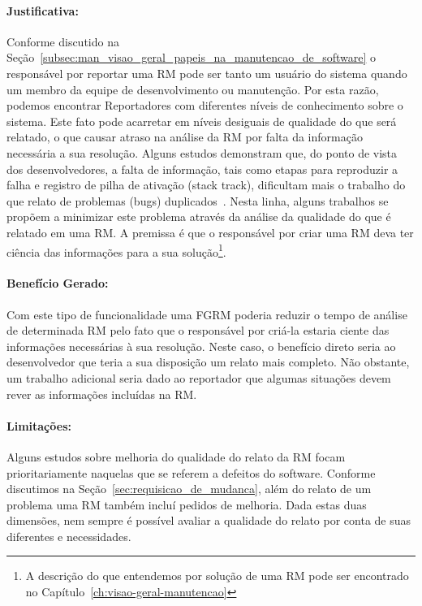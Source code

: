 
\paragraph{Justificativa:}
\label{par:justificativa_s01}

Conforme discutido na
Seção~\ref{subsec:man_visao_geral_papeis_na_manutencao_de_software} o
responsável por reportar uma RM pode ser tanto um usuário do sistema quando um
membro da equipe de desenvolvimento ou manutenção. Por esta razão, podemos
encontrar Reportadores com diferentes níveis de conhecimento sobre o sistema.
Este fato pode acarretar em níveis desiguais de qualidade do que será relatado,
o que causar atraso na análise da RM por falta da informação necessária a sua
resolução. Alguns estudos demonstram que, do ponto de vista dos desenvolvedores,
a falta de informação, tais como etapas para reproduzir a falha e registro de
pilha de ativação (stack track), dificultam mais o trabalho do que relato de
problemas (bugs) duplicados~\cite{bettenburg2008makes, bettenburg2007quality}.
Nesta linha, alguns trabalhos se propõem a minimizar este problema através da
análise da qualidade do que é relatado em uma RM\@. A premissa é que o
responsável por criar uma RM deva ter ciência das informações para a sua
solução\footnote{A descrição do que entendemos por solução de uma RM pode ser
    encontrado no Capítulo~\ref{ch:visao-geral-manutencao}}.

\paragraph{Benefício Gerado:}
\label{par:beneficio_s01}

Com este tipo de funcionalidade uma FGRM poderia reduzir o tempo de análise de
determinada RM pelo fato que o responsável por criá-la estaria ciente das
informações necessárias à sua resolução. Neste caso, o benefício direto seria ao
desenvolvedor que teria a sua disposição um relato mais completo. Não obstante,
um trabalho adicional seria dado ao reportador que algumas situações devem rever
as informações incluídas na RM\@.

\paragraph{Limitações:}
\label{par:limitacoes_s01}

Alguns estudos sobre melhoria do qualidade do relato da RM focam
prioritariamente naquelas que se referem a defeitos do software. Conforme
discutimos na Seção~\ref{sec:requisicao_de_mudanca}, além do relato de um
problema uma RM também incluí pedidos de melhoria. Dada estas duas dimensões,
nem sempre é possível avaliar a qualidade do relato por conta de suas diferentes
e necessidades.

